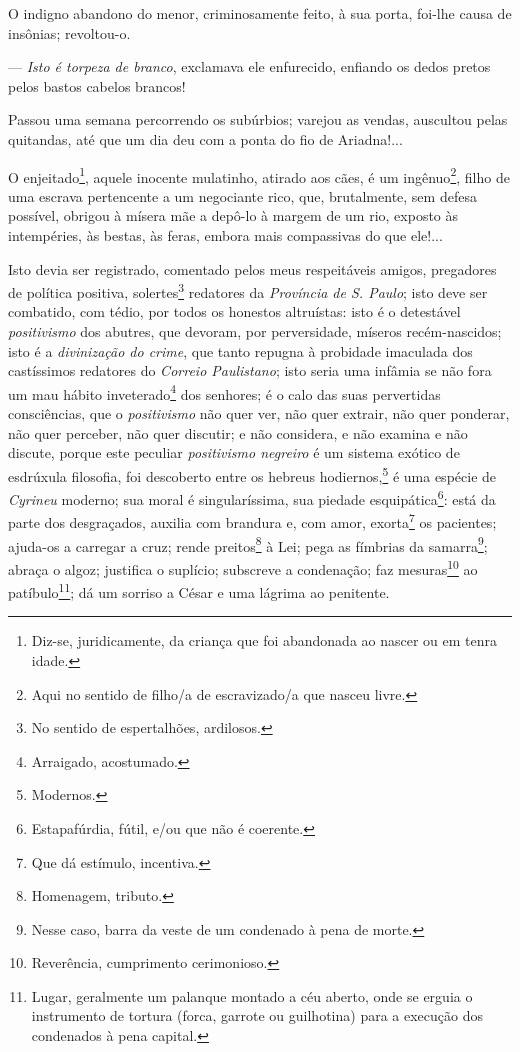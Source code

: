 O indigno abandono do menor, criminosamente feito, à sua porta, foi-lhe
causa de insônias; revoltou-o.

--- \emph{Isto é torpeza de branco}, exclamava ele enfurecido, enfiando
os dedos pretos pelos bastos cabelos brancos!

Passou uma semana percorrendo os subúrbios; varejou as vendas, auscultou
pelas quitandas, até que um dia deu com a ponta do fio de Ariadna!...

O enjeitado\footnote{Diz-se, juridicamente, da criança que foi
  abandonada ao nascer ou em tenra idade.}, aquele inocente mulatinho,
atirado aos cães, é um ingênuo\footnote{Aqui no sentido de filho/a de
  escravizado/a que nasceu livre.}, filho de uma escrava pertencente a
um negociante rico, que, brutalmente, sem defesa possível, obrigou à
mísera mãe a depô-lo à margem de um rio, exposto às intempéries, às
bestas, às feras, embora mais compassivas do que ele!...

Isto devia ser registrado, comentado pelos meus respeitáveis amigos,
pregadores de política positiva, solertes\footnote{No sentido de
  espertalhões, ardilosos.} redatores da \emph{Província de S. Paulo};
isto deve ser combatido, com tédio, por todos os honestos altruístas:
isto é o detestável \emph{positivismo} dos abutres, que devoram, por
perversidade, míseros recém-nascidos; isto é a \emph{divinização do
crime}, que tanto repugna à probidade imaculada dos castíssimos
redatores do \emph{Correio Paulistano}; isto seria uma infâmia se não
fora um mau hábito inveterado\footnote{Arraigado, acostumado.} dos
senhores; é o calo das suas pervertidas consciências, que o
\emph{positivismo} não quer ver, não quer extrair, não quer ponderar,
não quer perceber, não quer discutir; e não considera, e não examina e
não discute, porque este peculiar \emph{positivismo negreiro} é um
sistema exótico de esdrúxula filosofia, foi descoberto entre os hebreus
hodiernos,\footnote{Modernos.} é uma espécie de \emph{Cyrineu}
moderno; sua moral é singularíssima, sua piedade esquipática\footnote{
  Estapafúrdia, fútil, e/ou que não é coerente.}: está da parte dos
desgraçados, auxilia com brandura e, com amor, exorta\footnote{Que dá
  estímulo, incentiva.} os pacientes; ajuda-os a carregar a cruz; rende
preitos\footnote{Homenagem, tributo.} à Lei; pega as fímbrias da
samarra\footnote{Nesse caso, barra da veste de um condenado à pena de
  morte.}; abraça o algoz; justifica o suplício; subscreve a condenação;
faz mesuras\footnote{Reverência, cumprimento cerimonioso.} ao
patíbulo\footnote{Lugar, geralmente um palanque montado a céu aberto,
  onde se erguia o instrumento de tortura (forca, garrote ou guilhotina)
  para a execução dos condenados à pena capital.};
dá um sorriso a César e uma
lágrima ao penitente.

